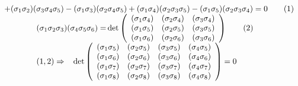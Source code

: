 \documentclass[11pt]{article} %
\begin{document}
\[\begin{array}{l}
{\rm{ + (}}{{\bf{\sigma }}_1}{{\bf{\sigma }}_2}{\rm{)(}}{{\bf{\sigma }}_3}{{\bf{\sigma }}_4}{{\bf{\sigma }}_5}{\rm{) - (}}{{\bf{\sigma }}_1}{{\bf{\sigma }}_3}{\rm{)(}}{{\bf{\sigma }}_2}{{\bf{\sigma }}_4}{{\bf{\sigma }}_5}{\rm{)}} + {\rm{(}}{{\bf{\sigma }}_1}{{\bf{\sigma }}_4}{\rm{)(}}{{\bf{\sigma }}_2}{{\bf{\sigma }}_3}{{\bf{\sigma }}_5}{\rm{) - (}}{{\bf{\sigma }}_1}{{\bf{\sigma }}_5}{\rm{)(}}{{\bf{\sigma }}_2}{{\bf{\sigma }}_3}{{\bf{\sigma }}_4}{\rm{)}} = 0\qquad (1)\\

\qquad \qquad {\rm{(}}{{\bf{\sigma }}_1}{{\bf{\sigma }}_2}{{\bf{\sigma }}_3}{\rm{)(}}{{\bf{\sigma }}_4}{{\bf{\sigma }}_5}{{\bf{\sigma }}_6}{\rm{) = }}\det \left( {\begin{array}{*{20}{c}}
{{\rm{(}}{{\bf{\sigma }}_1}{{\bf{\sigma }}_4}{\rm{)}}}&{{\rm{(}}{{\bf{\sigma }}_2}{{\bf{\sigma }}_4}{\rm{)}}}&{{\rm{(}}{{\bf{\sigma }}_3}{{\bf{\sigma }}_4}{\rm{)}}}\\
{{\rm{(}}{{\bf{\sigma }}_1}{{\bf{\sigma }}_5}{\rm{)}}}&{{\rm{(}}{{\bf{\sigma }}_2}{{\bf{\sigma }}_5}{\rm{)}}}&{{\rm{(}}{{\bf{\sigma }}_3}{{\bf{\sigma }}_5}{\rm{)}}}\\
{{\rm{(}}{{\bf{\sigma }}_1}{{\bf{\sigma }}_6}{\rm{)}}}&{{\rm{(}}{{\bf{\sigma }}_2}{{\bf{\sigma }}_6}{\rm{)}}}&{{\rm{(}}{{\bf{\sigma }}_3}{{\bf{\sigma }}_6}{\rm{)}}}
\end{array}} \right)\qquad (2)\\

\qquad \qquad (1,2) \Rightarrow \;\;\;\det \left( {\begin{array}{*{20}{c}}
{{\rm{(}}{{\bf{\sigma }}_1}{{\bf{\sigma }}_5}{\rm{)}}}&{{\rm{(}}{{\bf{\sigma }}_2}{{\bf{\sigma }}_5}{\rm{)}}}&{{\rm{(}}{{\bf{\sigma }}_3}{{\bf{\sigma }}_5}{\rm{)}}}&{{\rm{(}}{{\bf{\sigma }}_4}{{\bf{\sigma }}_5}{\rm{)}}}\\
{{\rm{(}}{{\bf{\sigma }}_1}{{\bf{\sigma }}_6}{\rm{)}}}&{{\rm{(}}{{\bf{\sigma }}_2}{{\bf{\sigma }}_6}{\rm{)}}}&{{\rm{(}}{{\bf{\sigma }}_3}{{\bf{\sigma }}_6}{\rm{)}}}&{{\rm{(}}{{\bf{\sigma }}_4}{{\bf{\sigma }}_6}{\rm{)}}}\\
{{\rm{(}}{{\bf{\sigma }}_1}{{\bf{\sigma }}_7}{\rm{)}}}&{{\rm{(}}{{\bf{\sigma }}_2}{{\bf{\sigma }}_7}{\rm{)}}}&{{\rm{(}}{{\bf{\sigma }}_3}{{\bf{\sigma }}_7}{\rm{)}}}&{{\rm{(}}{{\bf{\sigma }}_4}{{\bf{\sigma }}_7}{\rm{)}}}\\
{{\rm{(}}{{\bf{\sigma }}_1}{{\bf{\sigma }}_8}{\rm{)}}}&{{\rm{(}}{{\bf{\sigma }}_2}{{\bf{\sigma }}_8}{\rm{)}}}&{{\rm{(}}{{\bf{\sigma }}_3}{{\bf{\sigma }}_8}{\rm{)}}}&{{\rm{(}}{{\bf{\sigma }}_4}{{\bf{\sigma }}_8}{\rm{)}}}
\end{array}} \right) = 0
\end{array}\]
\end{document}

